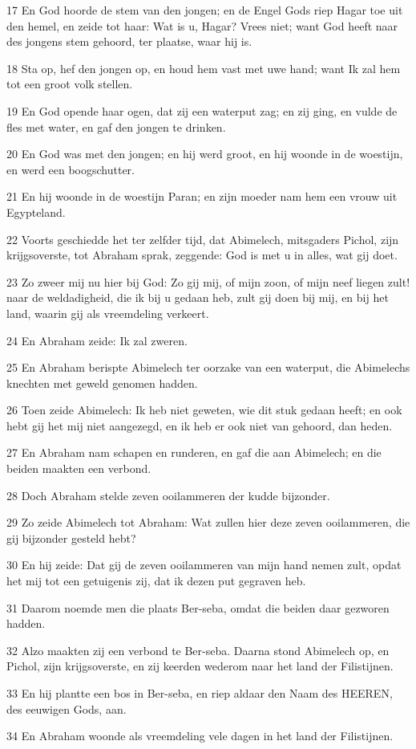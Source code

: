 \par 17 En God hoorde de stem van den jongen; en de Engel Gods riep Hagar toe uit den hemel, en zeide tot haar: Wat is u, Hagar? Vrees niet; want God heeft naar des jongens stem gehoord, ter plaatse, waar hij is.
\par 18 Sta op, hef den jongen op, en houd hem vast met uwe hand; want Ik zal hem tot een groot volk stellen.
\par 19 En God opende haar ogen, dat zij een waterput zag; en zij ging, en vulde de fles met water, en gaf den jongen te drinken.
\par 20 En God was met den jongen; en hij werd groot, en hij woonde in de woestijn, en werd een boogschutter.
\par 21 En hij woonde in de woestijn Paran; en zijn moeder nam hem een vrouw uit Egypteland.
\par 22 Voorts geschiedde het ter zelfder tijd, dat Abimelech, mitsgaders Pichol, zijn krijgsoverste, tot Abraham sprak, zeggende: God is met u in alles, wat gij doet.
\par 23 Zo zweer mij nu hier bij God: Zo gij mij, of mijn zoon, of mijn neef liegen zult! naar de weldadigheid, die ik bij u gedaan heb, zult gij doen bij mij, en bij het land, waarin gij als vreemdeling verkeert.
\par 24 En Abraham zeide: Ik zal zweren.
\par 25 En Abraham berispte Abimelech ter oorzake van een waterput, die Abimelechs knechten met geweld genomen hadden.
\par 26 Toen zeide Abimelech: Ik heb niet geweten, wie dit stuk gedaan heeft; en ook hebt gij het mij niet aangezegd, en ik heb er ook niet van gehoord, dan heden.
\par 27 En Abraham nam schapen en runderen, en gaf die aan Abimelech; en die beiden maakten een verbond.
\par 28 Doch Abraham stelde zeven ooilammeren der kudde bijzonder.
\par 29 Zo zeide Abimelech tot Abraham: Wat zullen hier deze zeven ooilammeren, die gij bijzonder gesteld hebt?
\par 30 En hij zeide: Dat gij de zeven ooilammeren van mijn hand nemen zult, opdat het mij tot een getuigenis zij, dat ik dezen put gegraven heb.
\par 31 Daarom noemde men die plaats Ber-seba, omdat die beiden daar gezworen hadden.
\par 32 Alzo maakten zij een verbond te Ber-seba. Daarna stond Abimelech op, en Pichol, zijn krijgsoverste, en zij keerden wederom naar het land der Filistijnen.
\par 33 En hij plantte een bos in Ber-seba, en riep aldaar den Naam des HEEREN, des eeuwigen Gods, aan.
\par 34 En Abraham woonde als vreemdeling vele dagen in het land der Filistijnen.


